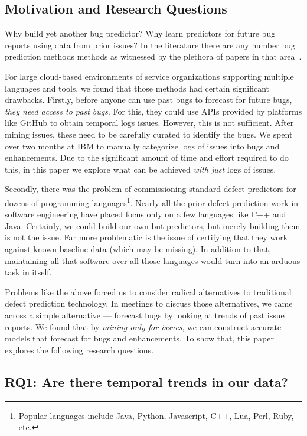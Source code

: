 \documentclass[sigconf, preprint]{acmart}
\begin{document}
\subsection{Motivation and Research Questions}
\label{mr}
Why build yet another bug predictor? Why learn predictors for future bug reports using
data from prior issues? In the literature there are  any number bug prediction methods 
methods as witnessed by the plethora of papers in that area~\cite{krishna2017less, krishna2016too, menzies2007data, turhan2009relative, menzies2010defect}. 

For large cloud-based environments of service 
organizations supporting multiple languages and tools, we found that those 
methods had certain significant drawbacks.
Firstly, before anyone can use past bugs to forecast for future bugs,
{\em they need access to past bugs}.  For this, they could use APIs provided by platforms like GitHub to obtain temporal logs issues. However, this is not sufficient. After mining issues, these need to be carefully curated to identify the bugs. We spent over two months at IBM to manually categorize logs of issues into bugs and enhancements. Due to the significant amount of time and effort required to do this, in this paper we explore what can be achieved {\em with just} logs of issues.

Secondly, there was the problem of commissioning standard defect predictors for 
dozens of programming languages\footnote{Popular languages include Java, 
Python, 
Javascript, C++, Lua, Perl, Ruby, etc.}. Nearly all 
the prior defect prediction work in software engineering have placed focus only 
on a few languages like C++ and Java. Certainly, we could 
build our own but predictors, but merely building them is not the issue. Far more problematic 
is the issue of certifying that they work against known baseline data (which 
may be missing). In addition to that, maintaining all that software over all 
those languages would turn into an arduous task in itself.


Problems like the above forced us to consider radical alternatives to 
traditional defect prediction technology. In meetings to discuss those 
alternatives, we came across a simple alternative --- forecast bugs by looking 
at trends of past issue reports.
 We found that 
by \textit{mining only for issues}, we can construct accurate models that 
forecast for bugs and enhancements. To show that, this paper explores the following research questions.

\subsection*{RQ1: Are there temporal trends in our data?}
\end{document}
